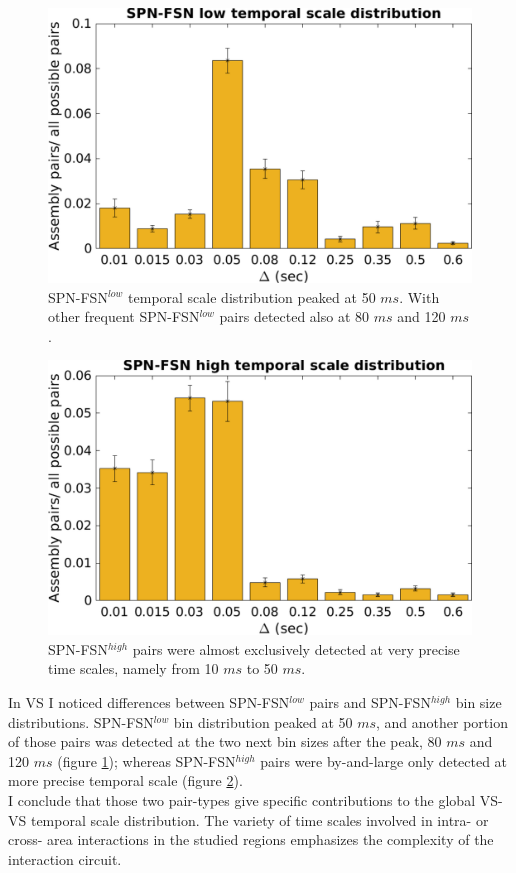 \begin{figure}
    \centering
    \includegraphics[scale=0.5]{figures/SPN_FSNlow1.pdf}
    \caption{SPN-FSN$^{low}$ temporal scale distribution peaked at 50 $ms$. With other frequent SPN-FSN$^{low}$ pairs detected also at 80 $ms$ and 120 $ms$.}
    \label{fig:SPN_FSNlowBin}
\end{figure}
\begin{figure}
    \centering
    \includegraphics[scale=0.5]{figures/SPN_FSNhigh1.pdf}
    \caption{SPN-FSN$^{high}$ pairs were almost exclusively detected at very precise time scales, namely from 10 $ms$ to 50 $ms$.}
    \label{fig:SPN_FSNhighBin}
\end{figure}
In VS I noticed differences between SPN-FSN$^{low}$ pairs and SPN-FSN$^{high}$ bin size distributions. SPN-FSN$^{low}$ bin distribution peaked at 50 $ms$, and another portion of those pairs was detected at the two next bin sizes after the peak, 80 $ms$ and 120 $ms$ (figure \ref{fig:SPN_FSNlowBin}); whereas SPN-FSN$^{high}$ pairs were by-and-large only detected at more precise temporal scale (figure \ref{fig:SPN_FSNhighBin}).\\ I conclude that those two pair-types give specific contributions to the global VS-VS temporal scale distribution. The variety of time scales involved in intra- or cross- area interactions in the studied regions emphasizes the complexity of the interaction circuit.
